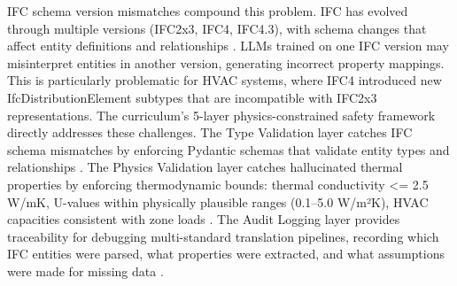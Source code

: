 \documentclass[12pt,a4paper]{article}
\begin{document}
IFC schema version mismatches compound this problem. IFC has evolved through multiple versions (IFC2x3, IFC4, IFC4.3), with schema changes that affect entity definitions and relationships \cite{ref29}. LLMs trained on one IFC version may misinterpret entities in another version, generating incorrect property mappings. This is particularly problematic for HVAC systems, where IFC4 introduced new IfcDistributionElement subtypes that are incompatible with IFC2x3 representations.
The curriculum's 5-layer physics-constrained safety framework directly addresses these challenges. The Type Validation layer catches IFC schema mismatches by enforcing Pydantic schemas that validate entity types and relationships \cite{ref170}. The Physics Validation layer catches hallucinated thermal properties by enforcing thermodynamic bounds: thermal conductivity <= 2.5 W/mK, U-values within physically plausible ranges (0.1--5.0 W/m²K), HVAC capacities consistent with zone loads \cite{ref21}. The Audit Logging layer provides traceability for debugging multi-standard translation pipelines, recording which IFC entities were parsed, what properties were extracted, and what assumptions were made for missing data \cite{ref36}.
\end{document}
